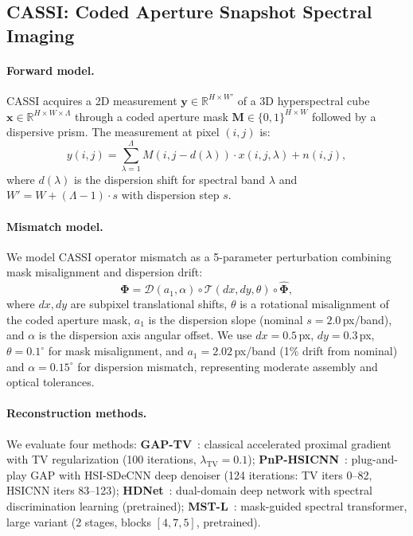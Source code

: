 \documentclass[runningheads]{llncs}
\begin{document}
\subsection{CASSI: Coded Aperture Snapshot Spectral Imaging}
\label{sec:cassi}

\paragraph{Forward model.}
CASSI acquires a 2D measurement $\mathbf{y} \in \mathbb{R}^{H \times W'}$ of a 3D hyperspectral cube $\mathbf{x} \in \mathbb{R}^{H \times W \times \Lambda}$ through a coded aperture mask $\mathbf{M} \in \{0,1\}^{H \times W}$ followed by a dispersive prism.
The measurement at pixel $(i, j)$ is:
\begin{equation}
    y(i, j) = \sum_{\lambda=1}^{\Lambda} M(i, j - d(\lambda)) \cdot x(i, j, \lambda) + n(i, j),
    \label{eq:cassi_forward}
\end{equation}
where $d(\lambda)$ is the dispersion shift for spectral band $\lambda$ and $W' = W + (\Lambda - 1) \cdot s$ with dispersion step $s$.

\paragraph{Mismatch model.}
We model CASSI operator mismatch as a 5-parameter perturbation combining mask misalignment and dispersion drift:
\begin{equation}
    \mathbf{\Phi} = \mathcal{D}(a_1, \alpha) \circ \mathcal{T}(dx, dy, \theta) \circ \hat{\mathbf{\Phi}},
\end{equation}
where $dx, dy$ are subpixel translational shifts, $\theta$ is a rotational misalignment of the coded aperture mask, $a_1$ is the dispersion slope (nominal $s = 2.0$\,px/band), and $\alpha$ is the dispersion axis angular offset.
We use $dx = 0.5$\,px, $dy = 0.3$\,px, $\theta = 0.1^\circ$ for mask misalignment, and $a_1 = 2.02$\,px/band (1\% drift from nominal) and $\alpha = 0.15^\circ$ for dispersion mismatch, representing moderate assembly and optical tolerances.

\paragraph{Reconstruction methods.}
We evaluate four methods:
\textbf{GAP-TV}~\cite{yuan2016gaptv}: classical accelerated proximal gradient with TV regularization (100 iterations, $\lambda_{\text{TV}} = 0.1$);
\textbf{PnP-HSICNN}~\cite{zheng2021pnp}: plug-and-play GAP with HSI-SDeCNN deep denoiser (124 iterations: TV iters 0--82, HSICNN iters 83--123);
\textbf{HDNet}~\cite{hu2022hdnet}: dual-domain deep network with spectral discrimination learning (pretrained);
\textbf{MST-L}~\cite{cai2022mst}: mask-guided spectral transformer, large variant (2 stages, blocks $[4,7,5]$, pretrained).
\end{document}
